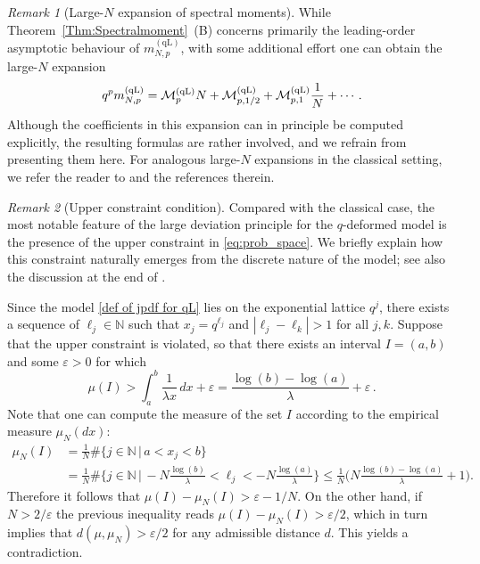 \documentclass{amsart}
\theoremstyle{plain}
\theoremstyle{remark}
\newtheorem{rem}{Remark}
\numberwithin{equation}{section}
\begin{document}
  

\begin{rem}[Large-$N$ expansion of spectral moments] While Theorem~\ref{Thm:Spectralmoment}~(B) concerns primarily the leading-order asymptotic behaviour of ${m}_{N,p}^{(\mathrm{qL})}$, with some additional effort one can obtain the large-$N$ expansion
    \begin{equation}\label{eqn:qpMNp expansion}
        q^{p}{m}_{N,p}^{(\mathrm{qL})}
        =\mathcal{M}_{p}^{ \rm (qL) }N+\mathcal{M}_{p,1/2}^{ \rm (qL) }+\mathcal{M}_{p,1}^{ \rm (qL) } \frac{1}{N} + \cdots. 
    \end{equation}
Although the coefficients in this expansion can in principle be computed explicitly, the resulting formulas are rather involved, and we refrain from presenting them here. For analogous large-$N$ expansions in the classical setting, we refer the reader to \cite{FRW17,WF14} and the references therein. 
\end{rem}







 
\begin{rem}[Upper constraint condition] \label{Rem_upper constraint}
   Compared with the classical case, the most notable feature of the large deviation principle for the $q$-deformed model is the presence of the upper constraint in \eqref{eq:prob_space}. We briefly explain how this constraint naturally emerges from the discrete nature of the model; see also the discussion at the end of \cite[Subsection~1.2.2]{DD22}.

    Since the model \eqref{def of jpdf for qL} lies on the exponential lattice $q^j$, there exists a sequence of $\ell_j\in \mathbb{N}$ such that $x_j = q^{\ell_j}$ and $|\ell_j - \ell_{k}|>1$ for all $j,k$. Suppose that the upper constraint is violated, so that there exists an interval $I=(a,b)$ and some $\varepsilon>0$ for which
    \begin{equation*}
        \mu(I)>\int_{a}^b \frac{1}{\lambda x} \, dx + \varepsilon = \frac{\log(b) -\log(a)}{\lambda} +\varepsilon\,.
    \end{equation*}
    Note that one can compute the measure of the set $I$ according to the empirical measure $\mu_N(dx)$: 
    \begin{align*}
          \mu_N(I) & = \frac{1}{N} \#\{j\in\mathbb{N} \,|\, a<x_j<b\}
          \\
          & = \frac{1}{N} \#\Big\{j\in\mathbb{N} \,|\, -N \frac{\log(b)}{\lambda}<\ell_j<-N \frac{\log(a)}{\lambda}\Big\} \leq \frac{1}{N}\Big(N\frac{\log(b) - \log(a)}{\lambda} + 1 \Big).
    \end{align*} 
    Therefore it follows that $  \mu(I) - \mu_N(I) > \varepsilon - 1/N.$ On the other hand, if $N> 2/\varepsilon$ the previous inequality reads $\mu(I) - \mu_N(I) > \varepsilon/2$, which in turn implies that $ d(\mu,\mu_N)>\varepsilon/2$ for any admissible distance $d$. This yields a contradiction. 
\end{rem}
 
\end{document}
